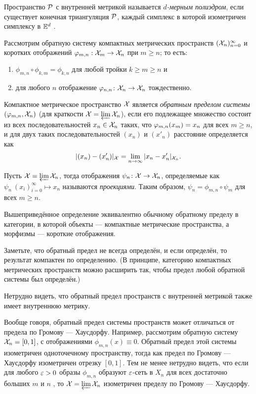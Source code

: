 \documentclass[oneside,a4paper]{article}
\begin{document}
Пространство $\mathcal{P}$ с внутренней метрикой называется 
\emph{$d$-мерным полиэдром}, если существует конечная триангуляция  $\mathcal{P}$, каждый симплекс в которой изометричен симплексу в $\mathbb{E}^d$
.

Рассмотрим обратную систему компактных метрических пространств
$(\mathcal{X}_n)_{n=0}^\infty$ и коротких отображений $\varphi_{m,n}:\mathcal{X}_m\to \mathcal{X}_n$ при $m\ge n$;
то есть:
\begin{enumerate}
\item $\phi_{m,n}\circ \phi_{k,m}=\phi_{k,n}$ для любой тройки $k\ge m\ge n$ и
\item для любого $n$ отображение $\varphi_{n,n}\colon\mathcal{X}_n\to \mathcal{X}_n$ тождественно.
\end{enumerate}
Компактное метрическое пространство $\mathcal{X}$ 
является \emph{обратным пределом системы $(\varphi_{m,n}, \mathcal{X}_n)$} (для краткости $\mathcal{X}=\varprojlim \mathcal{X}_n$), если его подлежащее множество состоит из всех последовательностей $x_n\in \mathcal{X}_n$ таких, что $\phi_{m,n}(x_m)\z=x_n$ для всех $m\ge n$,
и для двух таких последовательностей $(x_n)$ и $(x'_n)$ расстояние определяется как 
$$|(x_n)-(x'_n)|_{\mathcal{X}}=\lim_{n\to\infty}|x_n- x'_n|_{\mathcal{X}_n}.$$

Пусть $\mathcal{X}=\varprojlim \mathcal{X}_n$, тогда отображения $\psi_n\colon\mathcal{X}\to \mathcal{X}_n$, определяемые как $\psi_n\:(x_i)_{i=0}^\infty\mapsto x_n$ называются \emph{проекциями}.
Таким образом, $\psi_n=\phi_{m,n}\circ\psi_m$ для всех $m\ge n$. 

Вышеприведённое определение эквивалентно обычному обратному пределу в категории, в которой объекты --- компактные метрические пространства,  
а морфизмы --- короткие отображения.

Заметьте, что обратный предел не всегда определён, и
если определён, то результат компактен по определению.
(В принципе, категорию компактных метрических пространств можно расширить так, чтобы предел любой обратной системы был определён.)

Нетрудно видеть, что обратный предел пространств с внутренней метрикой также имеет внутреннюю метрику.

Вообще говоря, обратный предел системы пространств может отличаться от предела по Громову --- Хаусдорфу.
Например, рассмотрим обратную систему $\mathcal{X}_n=[0,1]$, с отображениями $\phi_{m,n}(x)\equiv 0$. 
Обратный предел этой системы изометричен одноточечному пространству, тогда как предел по Громову --- Хаусдорфу изометричен отрезку $[0,1]$.
Тем не менее нетрудно видеть, что если для любого $\varepsilon>0$ образы $\phi_{m,n}$ образуют $\varepsilon$-сеть в $X_n$ для всех достаточно больших $m$ и $n$ , то $\mathcal{X}=\varprojlim \mathcal{X}_n$ изометричен пределу по Громову --- Хаусдорфу.
\end{document}
